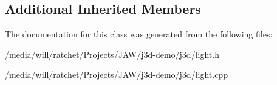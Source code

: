 \subsection*{Additional Inherited Members}


The documentation for this class was generated from the following files\+:\begin{DoxyCompactItemize}
\item 
/media/will/ratchet/\+Projects/\+J\+A\+W/j3d-\/demo/j3d/light.\+h\item 
/media/will/ratchet/\+Projects/\+J\+A\+W/j3d-\/demo/j3d/light.\+cpp\end{DoxyCompactItemize}
